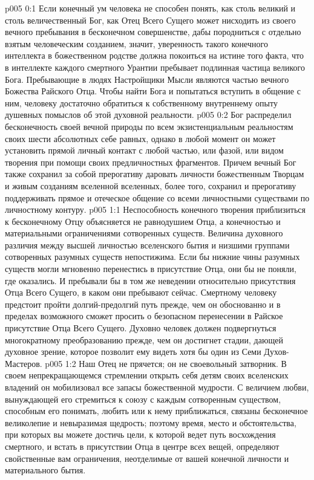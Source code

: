 \author{Божественный Советник}
\vs p005 0:1 Если конечный ум человека не способен понять, как столь великий и столь величественный Бог, как Отец Всего Сущего может нисходить из своего вечного пребывания в бесконечном совершенстве, дабы породниться с отдельно взятым человеческим созданием, значит, уверенность такого конечного интеллекта в божественном родстве должна покоиться на истине того факта, что в интеллекте каждого смертного Урантии пребывает подлинная частица великого Бога. Пребывающие в людях Настройщики Мысли являются частью вечного Божества Райского Отца. Чтобы найти Бога и попытаться вступить в общение с ним, человеку достаточно обратиться к собственному внутреннему опыту душевных помыслов об этой духовной реальности.
\vs p005 0:2 Бог распределил бесконечность своей вечной природы по всем экзистенциальным реальностям своих шести абсолютных себе равных, однако в любой момент он может установить прямой личный контакт с любой частью, или фазой, или видом творения при помощи своих предличностных фрагментов. Причем вечный Бог также сохранил за собой прерогативу даровать личности божественным Творцам и живым созданиям вселенной вселенных, более того, сохранил и прерогативу поддерживать прямое и отеческое общение со всеми личностными существами по личностному контуру.
\vs p005 1:1 Неспособность конечного творения приблизиться к бесконечному Отцу объясняется не равнодушием Отца, а конечностью и материальными ограничениями сотворенных существ. Величина духовного различия между высшей личностью вселенского бытия и низшими группами сотворенных разумных существ непостижима. Если бы нижние чины разумных существ могли мгновенно перенестись в присутствие Отца, они бы не поняли, где оказались. И пребывали бы в том же неведении относительно присутствия Отца Всего Сущего, в каком они пребывают сейчас. Смертному человеку предстоит пройти долгий\hyp{}предолгий путь прежде, чем он обоснованно и в пределах возможного сможет просить о безопасном перенесении в Райское присутствие Отца Всего Сущего. Духовно человек должен подвергнуться многократному преобразованию прежде, чем он достигнет стадии, дающей духовное зрение, которое позволит ему видеть хотя бы один из Семи Духов\hyp{}Мастеров.
\vs p005 1:2 Наш Отец не прячется; он не своевольный затворник. В своем непрекращающемся стремлении открыть себя детям своих вселенских владений он мобилизовал все запасы божественной мудрости. С величием любви, вынуждающей его стремиться к союзу с каждым сотворенным существом, способным его понимать, любить или к нему приближаться, связаны бесконечное великолепие и невыразимая щедрость; поэтому время, место и обстоятельства, при которых вы можете достичь цели, к которой ведет путь восхождения смертного, и встать в присутствии Отца в центре всех вещей, определяют свойственные вам ограничения, неотделимые от вашей конечной личности и материального бытия.
